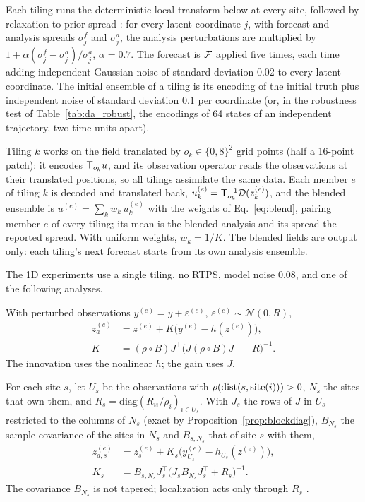  Each tiling runs the deterministic local transform below at every site,
followed by relaxation to prior spread \citep{whitakerhamill2012}: for every latent coordinate $j$,
with forecast and analysis spreads $\sigma^f_j$ and $\sigma^a_j$, the analysis perturbations are
multiplied by $1+\alpha(\sigma^f_j-\sigma^a_j)/\sigma^a_j$, $\alpha=0.7$. The forecast is $\mathcal{F}$ applied
five times, each time adding independent Gaussian noise of standard deviation $0.02$ to every latent
coordinate. The initial ensemble of a tiling is its encoding of the initial truth plus independent
noise of standard deviation $0.1$ per coordinate (or, in the robustness test of
Table~\ref{tab:da_robust}, the encodings of 64 states of an independent trajectory, two time units
apart).

 Tiling $k$ works on the field translated by $o_k\in\{0,8\}^2$ grid points
(half a 16-point patch): it encodes $\mathsf{T}_{o_k}u$, and its observation operator reads the observations
at their translated positions, so all tilings assimilate the same data. Each member $e$ of tiling $k$
is decoded and translated back, $u^{(e)}_k=\mathsf{T}_{o_k}^{-1}\mathcal{D}(z^{(e)}_k)$, and the blended ensemble is
$u^{(e)}=\sum_k w_k\,u^{(e)}_k$ with the weights of Eq.~\eqref{eq:blend}, pairing member $e$ of every
tiling; its mean is the blended analysis and its spread the reported spread. With uniform weights,
$w_k=1/K$. The blended fields are output only: each tiling's next forecast starts from its own
analysis ensemble.

 The 1D experiments use a single tiling, no RTPS, model noise $0.08$, and
one of the following analyses.

 With perturbed observations
$y^{(e)}=y+\varepsilon^{(e)}$, $\varepsilon^{(e)}\sim\mathcal N(0,R)$,
\begin{equation}
\begin{aligned}
  z_a^{(e)} &= z^{(e)} + K\big(y^{(e)}-h(z^{(e)})\big),\\
  K &= (\rho\circ B)J^\top\big(J(\rho\circ B)J^\top+R\big)^{-1}.
\end{aligned}
\end{equation}
The innovation uses the nonlinear $h$; the gain uses $J$.

 For each site $s$, let $U_s$ be the observations
with $\rho(\operatorname{dist}(s,\mathrm{site}(i)))>0$, $N_s$ the sites that own them,
and $R_s=\mathrm{diag}(R_{ii}/\rho_i)_{i\in U_s}$. With $J_s$ the rows of $J$
in $U_s$ restricted to the columns of $N_s$ (exact by
Proposition~\ref{prop:blockdiag}), $B_{N_s}$ the sample covariance of the
sites in $N_s$ and $B_{s,N_s}$ that of site $s$ with them,
\begin{equation}
\begin{aligned}
  z_{a,s}^{(e)} &= z_s^{(e)} + K_s\big(y^{(e)}_{U_s}-h_{U_s}(z^{(e)})\big),\\
  K_s &= B_{s,N_s}J_s^\top\big(J_sB_{N_s}J_s^\top+R_s\big)^{-1}.
\end{aligned}
\end{equation}
The covariance $B_{N_s}$ is not tapered; localization acts only through
$R_s$ \citep{hunt2007}.


